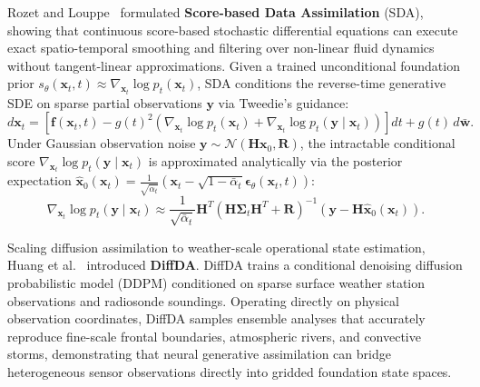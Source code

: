 Rozet and Louppe~\cite{rozet2023sda} formulated \textbf{Score-based Data Assimilation} (SDA), showing that continuous score-based stochastic differential equations can execute exact spatio-temporal smoothing and filtering over non-linear fluid dynamics without tangent-linear approximations. Given a trained unconditional foundation prior $s_\theta(\mathbf{x}_t, t) \approx \nabla_{\mathbf{x}_t} \log p_t(\mathbf{x}_t)$, SDA conditions the reverse-time generative SDE on sparse partial observations $\mathbf{y}$ via Tweedie's guidance:
\begin{equation}
    d\mathbf{x}_t = \left[ \mathbf{f}(\mathbf{x}_t, t) - g(t)^2 \left( \nabla_{\mathbf{x}_t} \log p_t(\mathbf{x}_t) + \nabla_{\mathbf{x}_t} \log p_t(\mathbf{y} \mid \mathbf{x}_t) \right) \right] dt + g(t) \, d\mathbf{\bar{w}}.
    \label{eq:score_da_sde}
\end{equation}
Under Gaussian observation noise $\mathbf{y} \sim \mathcal{N}(\mathbf{H}\mathbf{x}_0, \mathbf{R})$, the intractable conditional score $\nabla_{\mathbf{x}_t} \log p_t(\mathbf{y} \mid \mathbf{x}_t)$ is approximated analytically via the posterior expectation $\hat{\mathbf{x}}_0(\mathbf{x}_t) = \frac{1}{\sqrt{\bar{\alpha}_t}} (\mathbf{x}_t - \sqrt{1 - \bar{\alpha}_t} \boldsymbol{\epsilon}_\theta(\mathbf{x}_t, t))$:
\begin{equation}
    \nabla_{\mathbf{x}_t} \log p_t(\mathbf{y} \mid \mathbf{x}_t) \approx \frac{1}{\sqrt{\bar{\alpha}_t}} \mathbf{H}^T \left( \mathbf{H} \boldsymbol{\Sigma}_t \mathbf{H}^T + \mathbf{R} \right)^{-1} \left( \mathbf{y} - \mathbf{H} \hat{\mathbf{x}}_0(\mathbf{x}_t) \right).
    \label{eq:tweedie_da_gradient}
\end{equation}

Scaling diffusion assimilation to weather-scale operational state estimation, Huang et al.~\cite{huang2024diffda} introduced \textbf{DiffDA}. DiffDA trains a conditional denoising diffusion probabilistic model (DDPM) conditioned on sparse surface weather station observations and radiosonde soundings. Operating directly on physical observation coordinates, DiffDA samples ensemble analyses that accurately reproduce fine-scale frontal boundaries, atmospheric rivers, and convective storms, demonstrating that neural generative assimilation can bridge heterogeneous sensor observations directly into gridded foundation state spaces.

